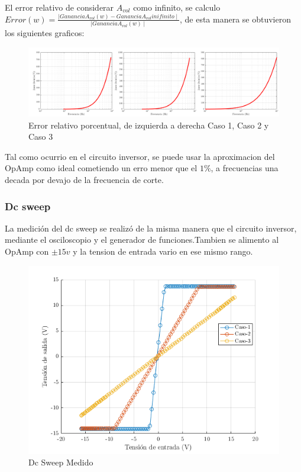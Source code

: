 \documentclass[../../main.tex]{subfiles}
\begin{document}
El error relativo de considerar $A_{vol}$  como infinito, se calculo $ Error(w) = \frac {\mid Ganancia A_{vol}(w) -Ganancia A_{vol} inifinito \mid} {\mid Ganancia A_{vol} (w) \mid }$, de esta manera se obtuvieron los siguientes graficos:

\begin{figure}[H]
\centering
\includegraphics[width=1\textwidth]{error_n}
\caption{Error relativo porcentual, de izquierda a derecha Caso 1, Caso 2 y Caso 3} \label{fig=errorn}
\end{figure}

Tal como ocurrio en el circuito inversor, se puede usar la aproximacion del OpAmp como ideal cometiendo un erro menor que el $1\%$, a frecuencias una decada por devajo de la frecuencia de corte.


\subsubsection{Dc sweep}
La medición del dc sweep se realizó de la misma manera que el circuito inversor, mediante el osciloscopio y el generador de funciones.Tambien se alimento al OpAmp con $\pm 15 v$ y la tension de entrada vario en ese mismo rango.

\begin{figure}[H]
\centering
\includegraphics[width=1\textwidth]{dc_sweep_n}
\caption{Dc Sweep Medido} \label{fig=dcn}
\end{figure}
\end{document}
